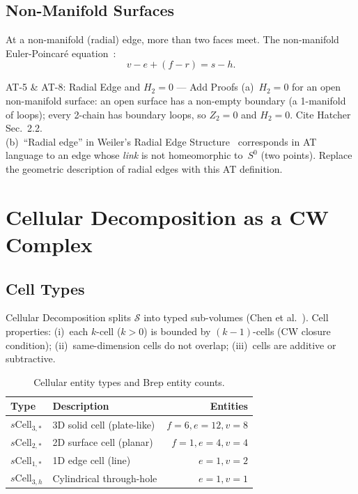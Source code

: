 \documentclass[journal,twocolumn,10pt]{IEEEtran}
\newcommand{\Hk}[1]{H_{#1}}
\newcommand{\Zk}[1]{Z_{#1}}
\newcommand{\sCell}[2]{s\text{Cell}_{#1,#2}}
\begin{document}
\subsection{Non-Manifold Surfaces}

At a non-manifold (radial) edge, more than two faces meet. The non-manifold
Euler-Poincar\'e equation~\cite{Yamaguchi2002}:
\begin{equation}
  v - e + (f-r) = s - h. \label{eqn:nonmanifold}
\end{equation}

\begin{atblock}{AT-5 \& AT-8: Radial Edge and $\Hk{2}=0$ --- Add Proofs}
(a)~$\Hk{2}=0$ for an open non-manifold surface: an open surface has a
non-empty boundary (a 1-manifold of loops); every 2-chain has boundary loops,
so $\Zk{2}=0$ and $\Hk{2}=0$. Cite Hatcher Sec.~2.2.\smallskip\\
(b)~``Radial edge'' in Weiler's Radial Edge Structure~\cite{Weiler1986}
corresponds in AT language to an edge whose \emph{link} is not homeomorphic
to~$S^0$ (two points). Replace the geometric description of radial edges with
this AT definition.
\end{atblock}

\section{Cellular Decomposition as a CW Complex}\label{sec:celldecomp}

\subsection{Cell Types}

Cellular Decomposition splits $\mathcal{S}$ into typed sub-volumes
(Chen et al.~\cite{Chen2006}). Cell properties: (i)~each $k$-cell ($k>0$)
is bounded by $(k-1)$-cells (CW closure condition); (ii)~same-dimension cells
do not overlap; (iii)~cells are additive or subtractive.

\begin{table}[ht]
\centering\small
\caption{Cellular entity types and Brep entity counts.}
\label{tbl:celltypes}
\begin{tabular}{@{}llr@{}}
\toprule
Type & Description & Entities \\
\midrule
$\sCell{3}{*}$ & 3D solid cell (plate-like) & $f{=}6, e{=}12, v{=}8$ \\
$\sCell{2}{*}$ & 2D surface cell (planar)   & $f{=}1, e{=}4,  v{=}4$ \\
$\sCell{1}{*}$ & 1D edge cell (line)        & $e{=}1, v{=}2$         \\
$\sCell{3}{h}$ & Cylindrical through-hole   & $e{=}1, v{=}1$         \\
\bottomrule
\end{tabular}
\end{table}
\end{document}
